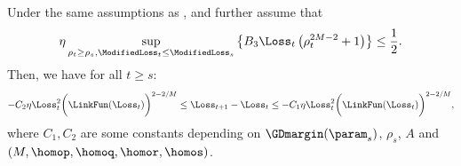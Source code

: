 \begin{lemma}
\label{lem: decrease of L}
Under the same assumptions as , and further assume that
\begin{equation*}
    \eta \sup_{\rho_t \ge \rho_s, \ModifiedLoss_t \le \ModifiedLoss_s} \left\{ B_3 \Loss_t \left( \rho_t^{2M - 2} + 1 \right) \right\} \le \frac{1}{2}.
\end{equation*}
Then, we have for all $t \ge s$:
\begin{equation}
\label{eq: decrease of L}
- C_2 \eta \Loss_t^2 \bigg(\LinkFun(\Loss_t)\bigg)^{2-2 / M} \le \Loss_{t+1} - \Loss_t \le  - C_1 \eta \Loss_t^2 \bigg(\LinkFun(\Loss_t)\bigg)^{2-2 / M},  
\end{equation}
where $C_1, C_2$ are some constants depending on $\GDmargin(\param_s)$, $\rho_s$, $A$ and $(M, \homop, \homoq, \homor, \homos)$.
\end{lemma}
